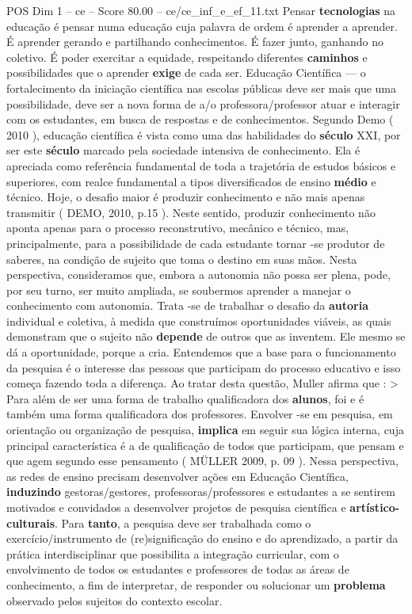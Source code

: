 \begin{textsample}{POS Dim 1 – ce – Score 80.00 – ce/ce\_inf\_e\_ef\_11.txt}
Pensar \textbf{tecnologias} na educação é pensar numa educação cuja palavra de ordem é aprender a aprender.
É aprender gerando e partilhando conhecimentos.
É fazer junto, ganhando no coletivo.
É poder exercitar a equidade, respeitando diferentes \textbf{caminhos} e possibilidades que o aprender \textbf{exige} de cada ser.
Educação Científica — o fortalecimento da iniciação científica nas escolas públicas deve ser mais que uma possibilidade, deve ser a nova forma de a/o professora/professor atuar e interagir com os estudantes, em busca de respostas e de conhecimentos.
Segundo Demo ( 2010 ), educação científica é vista como uma das habilidades do \textbf{século} XXI, por ser este \textbf{século} marcado pela sociedade intensiva de conhecimento.
Ela é apreciada como referência fundamental de toda a trajetória de estudos básicos e superiores, com realce fundamental a tipos diversificados de ensino \textbf{médio} e técnico.
Hoje, o desafio maior é produzir conhecimento e não mais apenas transmitir ( DEMO, 2010, p.15 ).
Neste sentido, produzir conhecimento não aponta apenas para o processo reconstrutivo, mecânico e técnico, mas, principalmente, para a possibilidade de cada estudante tornar -se produtor de saberes, na condição de sujeito que toma o destino em suas mãos.
Nesta perspectiva, consideramos que, embora a autonomia não possa ser plena, pode, por seu turno, ser muito ampliada, se soubermos aprender a manejar o conhecimento com autonomia.
Trata -se de trabalhar o desafio da \textbf{autoria} individual e coletiva, à medida que construímos oportunidades viáveis, as quais demonstram que o sujeito não \textbf{depende} de outros que as inventem.
Ele mesmo se dá a oportunidade, porque a cria.
Entendemos que a base para o funcionamento da pesquisa é o interesse das pessoas que participam do processo educativo e isso começa fazendo toda a diferença.
Ao tratar desta questão, Muller afirma que : > Para além de ser uma forma de trabalho qualificadora dos \textbf{alunos}, foi e é também uma forma qualificadora dos professores.
Envolver -se em pesquisa, em orientação ou organização de pesquisa, \textbf{implica} em seguir sua lógica interna, cuja principal característica é a de qualificação de todos que participam, que pensam e que agem segundo esse pensamento ( MÜLLER 2009, p. 09 ).
Nessa perspectiva, as redes de ensino precisam desenvolver ações em Educação Científica, \textbf{induzindo} gestoras/gestores, professoras/professores e estudantes a se sentirem motivados e convidados a desenvolver projetos de pesquisa científica e \textbf{artístico-culturais}.
Para \textbf{tanto}, a pesquisa deve ser trabalhada como o exercício/instrumento de (re)significação do ensino e do aprendizado, a partir da prática interdisciplinar que possibilita a integração curricular, com o envolvimento de todos os estudantes e professores de todas as áreas de conhecimento, a fim de interpretar, de responder ou solucionar um \textbf{problema} observado pelos sujeitos do contexto escolar.

\end{textsample}
